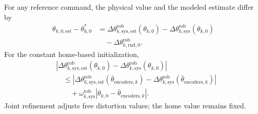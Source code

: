 \documentclass[../main.tex]{subfiles}
\begin{document}
For any reference command, the physical value and the modeled estimate differ by
\begin{equation*}
\begin{aligned}
\theta_{k,0,\mathrm{est}}-\theta^*_{k,0}
&=\Delta\theta^{\mathrm{rob}}_{k,\mathrm{sys},\mathrm{est}}(\theta_{k,0})
-\Delta\theta^{\mathrm{rob}}_{k,\mathrm{sys}}(\theta_{k,0})\\
&\quad-\Delta\theta^{\mathrm{rob}}_{k,\mathrm{rnd},0}.
\end{aligned}
\end{equation*}
For the constant home-based initialization,
\begin{equation*}
\begin{aligned}
&\left|\Delta\theta^{\mathrm{rob}}_{k,\mathrm{sys},\mathrm{est}}(\theta_{k,0})
-\Delta\theta^{\mathrm{rob}}_{k,\mathrm{sys}}(\theta_{k,0})\right|\\
&\quad\leq
\left|\Delta\theta^{\mathrm{rob}}_{k,\mathrm{sys},\mathrm{est}}(\bar\theta_{\mathrm{encoders},k})
-\Delta\theta^{\mathrm{rob}}_{k,\mathrm{sys}}(\bar\theta_{\mathrm{encoders},k})\right|\\
&\qquad+\omega^{\mathrm{rob}}_{k,\mathrm{sys}}\left|\theta_{k,0}-\bar\theta_{\mathrm{encoders},k}\right|.
\end{aligned}
\end{equation*}
Joint refinement adjusts free distortion values; the home value remains fixed.
\end{document}
